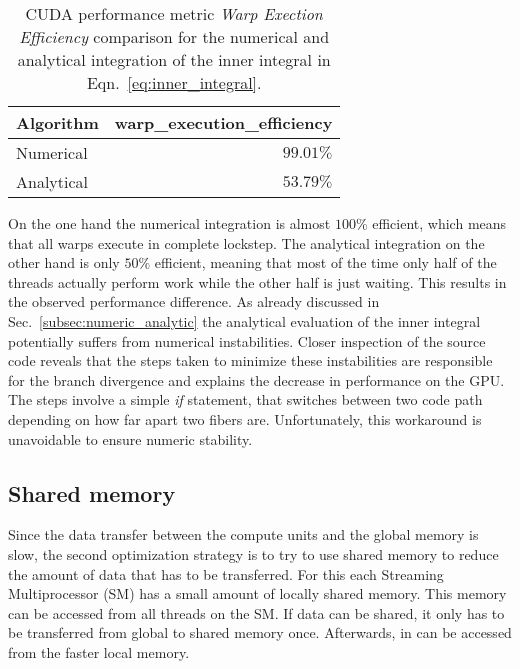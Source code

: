\begin{table}[!htbp]
  \begin{center}
    \begin{tabulary}{0.7\textwidth}{LR}
      \toprule
      Algorithm & warp\_execution\_efficiency \\
      \midrule
      Numerical & $99.01\%$ \\
      Analytical & $53.79\%$ \\
      \bottomrule
    \end{tabulary}
  \end{center}
  \caption[Warp Execution Efficiency of Numerical vs. Analytical Integration.]{CUDA performance metric \emph{Warp Exection Efficiency} comparison for the numerical and analytical integration of the inner integral in Eqn.~\eqref{eq:inner_integral}.}
  \label{tab:branch_divergence}
\end{table}

On the one hand the numerical integration is almost $100\%$ efficient, which means that all warps execute in complete lockstep. The analytical integration on the other hand is only $50\%$ efficient, meaning that most of the time only half of the threads actually perform work while the other half is just waiting. This results in the observed performance difference. As already discussed in Sec.~\ref{subsec:numeric_analytic} the analytical evaluation of the inner integral potentially suffers from numerical instabilities. Closer inspection of the source code reveals that the steps taken to minimize these instabilities are responsible for the branch divergence and explains the decrease in performance on the GPU. The steps involve a simple \emph{if} statement, that switches between two code path depending on how far apart two fibers are. Unfortunately, this workaround is unavoidable to ensure numeric stability.

\subsection{Shared memory}
\label{subsec:bench_shared_memory}

Since the data transfer between the compute units and the global memory is slow, the second optimization strategy is to try to use shared memory to reduce the amount of data that has to be transferred. For this each Streaming Multiprocessor (SM) has a small amount of locally shared memory. This memory can be accessed from all threads on the SM. If data can be shared, it only has to be transferred from global to shared memory once. Afterwards, in can be accessed from the faster local memory.

